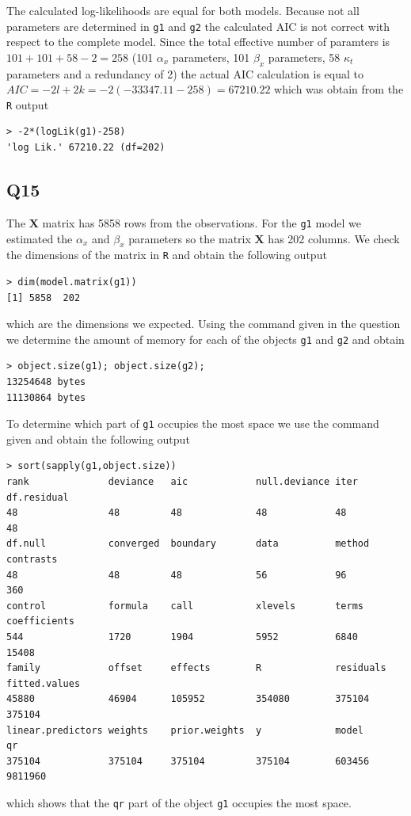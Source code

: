 \documentclass[11pt]{article}
\begin{document}
The calculated log-likelihoods are equal for both models. Because not all parameters are determined in \verb|g1| and \verb|g2| the calculated AIC is not correct with respect to the complete model. Since the total effective number of paramters is $101+101+58 - 2 = 258$ (101 $\alpha_x$ parameters, 101 $\beta_x$ parameters, 58 $\kappa_t$ parameters and a redundancy of 2) the actual AIC calculation is equal to $AIC = -2 l + 2 k = -2 (-33347.11 - 258) = 67210.22$ which was obtain from the \verb|R| output 
\begin{verbatim}
> -2*(logLik(g1)-258)
'log Lik.' 67210.22 (df=202)
\end{verbatim}


\subsection*{Q15}

The $\mathbf{X}$ matrix has 5858 rows from the observations. For the \verb|g1| model we estimated the $\alpha_x$ and $\beta_x$ parameters so the matrix $\mathbf{X}$ has 202 columns. We check the dimensions of the matrix in \verb|R| and obtain the following output
\begin{verbatim}
> dim(model.matrix(g1))
[1] 5858  202
\end{verbatim} 
which are the dimensions we expected. Using the command given in the question we determine the amount of memory for each of the objects \verb|g1| and \verb|g2| and obtain
\begin{verbatim}
> object.size(g1); object.size(g2);
13254648 bytes
11130864 bytes
\end{verbatim}	
To determine which part of \verb|g1| occupies the most space we use the command given and obtain the following output
\begin{verbatim}
> sort(sapply(g1,object.size))
rank              deviance   aic            null.deviance iter   df.residual 
48                48         48             48            48         48 
df.null           converged  boundary       data          method     contrasts 
48                48         48             56            96         360 
control           formula    call           xlevels       terms      coefficients 
544               1720       1904           5952          6840       15408 
family            offset     effects        R             residuals  fitted.values 
45880             46904      105952         354080        375104     375104 
linear.predictors weights    prior.weights  y             model      qr 
375104            375104     375104         375104        603456     9811960 
\end{verbatim}
which shows that the \verb|qr| part of the object \verb|g1| occupies the most space.
\end{document}
